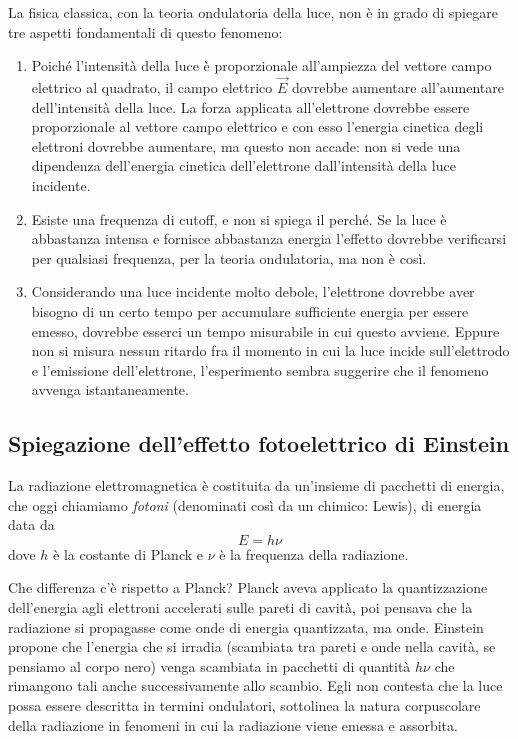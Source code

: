 La fisica classica, con la teoria ondulatoria della luce, non è in grado di spiegare tre aspetti fondamentali di questo fenomeno:
\begin{enumerate}[label=\Roman{*}]
\item Poiché l'intensità della luce è proporzionale all'ampiezza del vettore campo elettrico al quadrato, il campo elettrico $\vec E$ dovrebbe aumentare all'aumentare dell'intensità della luce.
La forza applicata all'elettrone dovrebbe essere proporzionale al vettore campo elettrico e con esso l'energia cinetica degli elettroni dovrebbe aumentare, ma questo non accade: non si vede una dipendenza dell'energia cinetica dell'elettrone dall'intensità della luce incidente.

\item Esiste una frequenza di cutoff, e non si spiega il perché. Se la luce è abbastanza intensa e fornisce abbastanza energia l'effetto dovrebbe verificarsi per qualsiasi frequenza, per la teoria ondulatoria, ma non è così. 

\item Considerando una luce incidente molto debole, l'elettrone dovrebbe aver bisogno di un certo tempo per accumulare sufficiente energia per essere emesso, dovrebbe esserci un tempo misurabile in cui questo avviene.
Eppure non si misura nessun ritardo fra il momento in cui la luce incide sull'elettrodo e l'emissione dell'elettrone, l'esperimento sembra suggerire che il fenomeno avvenga istantaneamente.
\end{enumerate}

\subsection{Spiegazione dell'effetto fotoelettrico di Einstein}
La radiazione elettromagnetica è costituita da un'insieme di pacchetti di energia, che oggi chiamiamo \textit{fotoni} (denominati così da un chimico: Lewis), di energia data da
\begin{equation}
E = h \nu
\end{equation}
dove $h$ è la costante di Planck e $\nu$ è la frequenza della radiazione.

Che differenza c'è rispetto a Planck?
Planck aveva applicato la quantizzazione dell'energia agli elettroni accelerati sulle pareti di cavità, poi pensava che la radiazione si propagasse come onde di energia quantizzata, ma onde.
Einstein propone che l'energia che si irradia (scambiata tra pareti e onde nella cavità, se pensiamo al corpo nero) venga scambiata in pacchetti di quantità $h\nu$ che rimangono tali anche successivamente allo scambio.
Egli non contesta che la luce possa essere descritta in termini ondulatori, sottolinea la natura corpuscolare della radiazione in fenomeni in cui la radiazione viene emessa e assorbita.

